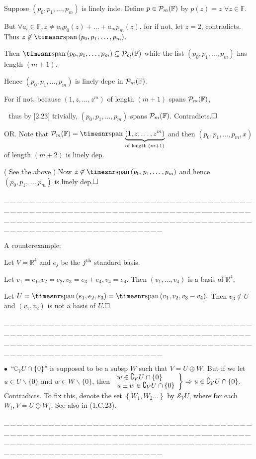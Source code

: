 \documentclass[a4paper, 11pt, UTF8]{article}
\def\Spn{{\timesnr\textup{span}}\,}
\def\Fbb{{\mathbb{F}}}
\def\Rbb{{\mathbb{R}}}
\def\BulletPoint{{\small$\bullet$}}
\def\Or{\large O{\footnotesize R.} }
\def\ProblemEnding{{\tiny \_\,\_\,\_\,\_\,\_\,\_\,\_\,\_\,\_\,\_\,\_\,\_\,\_\,\_\,\_\,\_\,\_\,\_\,\_\,\_\,\_\,\_\,\_\,\_\,\_\,\_\,\_\,\_\,\_\,\_\,\_\,\_\,\_\,\_\,\_\,\_\,\_\,\_\,\_\,\_\,\_\,\_\,\_\,\_\,\_\,\_\,\_\,\_\,\_\,\_\,\_\,\_\,\_\,\_\,\_\,\_\,\_\,\_\,\_\,\_\,\_\,\_\,\_\,\_\,\_\,\_\,\_\,\_\,\_\,\_\,\_\_\,\_\,\_\,\_\,\_\,\_\,\_\,\_\,\_\,\_\,\_\,\_\,\_\,\_\,\_\,\_\,\_\,\_\,\_\,\_\,\_\,\_\,\_\,\_\,\_\,\_\,\_\,\_\,\_\,\_\,\_\,\_\,\_\,\_\,\_\,\_\,\_\,\_\,\_\,\_\,\_\,\_\,\_\,\_\,\_\,\_\,\_\,\_\,\_\,\_\,\_\,\_\,\_\,\_\,\_\,\_\,\_\,\_\,\_\,\_\,\_\,\_\,\_\,\_\,\_\,\_\,\_\,\_\,\_\,\_\,\_}}
\def\ChapterEnding{\rightline{\timesbfx\Large{E{\small NDED}}}\par\vspace{6pt}}
\begin{document}
\begin{large}
\par\quad
Suppose $(p_0,p_1,\dots,p_m)$ is linely inde. Define $p\in\PoF{m}$ by $p(z)=z\,\,\forall z\in\Fbb.$\par\quad
But $\forall a_i\in\Fbb,z\neq a_0 p_0(z)+\dots+a_m p_m(z)$, for if not, let $z=2$, contradicts.
Thus $z\not\in\Spn(p_0,p_1,\dots,p_m)$.\par\quad
Then $\Spn(p_0,p_1,\dots,p_m)\subsetneq\PoF{m}$ while the list $(p_0,p_1,\dots,p_m)$ has length $(m+1)$.\par\quad
Hence $(p_0,p_1,\dots,p_m)$ is linely depe in $\PoF{m}$.\par\quad
For if not, because $(1,z,\dots,z^m)$ of length $(m+1)$ spans $\PoF{m}$,\par\qquad\qquad\quad\,\,
thus by [2.23] trivially, $(p_0,p_1,\dots,p_m)$ spans $\PoF{m}$. Contradicts.$\hfill\square$\vspace{10pt}\par\quad
\Or Note that $\PoF{m}=\Spn\underbrace{(1,z,\dots,z^m)}_{\textup{of length\;}(m+1)}$ and then $(p_0,p_1,\dots,p_m,x)$ of length $(m+2)$ is linely dep.\par\quad
( See the above ) Now $z\not\in\Spn(p_0,p_1,\dots,p_m)$ and hence $(p_0,p_1,\dots,p_m)$ is linely dep.$\hfill\square$\par
\ProblemEnding\par
\ChapterEnding


A counterexample:\par\quad
Let $V=\Rbb^4$ and $e_j$ be the $j^\textup{th}$ standard basis.\par\quad
Let $v_1=e_1,v_2=e_2,v_3=e_3+e_4,v_4=e_4.$ Then $(v_1,\dots,v_4)$ is a basis of $\Rbb^4.$\par\quad
Let $U=\Spn(e_1,e_2,e_3)=\Spn(v_1,v_2,v_3-v_4).$ Then $v_3\not\in U$ and $(v_1,v_2)$ is not a basis of $U.\hfill\square$\par\ProblemEnding\par

\BulletPoint \,\hspace{1pt}\TextB{}
$“\complement_V U \cap \{0\}”$ is supposed to be a subsp $W$ such that $V=U\oplus W$.\TextB{}
But if we let $u\in U\backslash\{0\}$ and $w\in W\backslash\{0\}$, then $\MathRightBrace{l}{w\in\complement_V U \cap \{0\}\\ u\pm w\in\complement_V U \cap \{0\} }\Rightarrow u\in\complement_V U \cap \{0\}.$ Contradicts.\vspace{4pt}\TextB{}
To fix this, {\Large denote the set $\left\{W_1,W_2\dots\right\}$ by $\mathcal{S}_V U$,} {\small where for each $W_i,V=U\oplus W_i$. See also in (1.C.23).}\par\ProblemEnding\par


\end{large}
\end{document}
